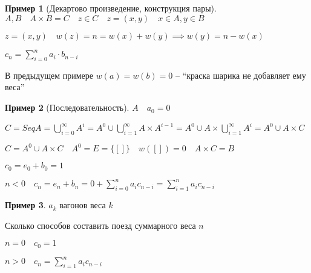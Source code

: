 \documentclass{book}
\theoremstyle{definition}
\newtheorem*{example}{Пример}
\begin{document}
\begin{example}
    [Декартово произведение, конструкция пары]
    $A,B\quad A\times B = C\quad z\in C\quad z = (x,y)\quad x\in A, y\in B$

    $z = (x,y)\quad w(z) = n = w(x)+w(y) \implies w(y) = n-w(x)$

    $c_n = \sum_{i=0}^{n} a_i\cdot b_{n-i}$ 

    В предыдущем примере $w(a) = w(b) = 0$ -- ``краска шарика не добавляет ему веса''
\end{example}

\begin{example}
    [Последовательность]

    $A\quad a_0 = 0$

    $C = Seq A = \bigcup\limits_{i=0}^{\infty }A^i = A^0 \cup \bigcup\limits_{i=1}^{\infty }A\times A^{i-1} = A^0 \cup A\times \bigcup\limits_{i=1}^{\infty } A^i = A^0\cup A\times C  $ 

    $C = A^0\cup A\times C\quad A^0 = E = \{[]\}\quad w([]) = 0\quad A\times C = B$

    $c_0 = e_0 + b_0 = 1$

    $n<0\quad c_n = e_n + b_n=0+\sum_{i=0}^{n} a_ic_{n-i} = \sum_{i=1}^{n} a_ic_{n-i}$
\end{example}

\begin{example}
    $a_k$ вагонов веса  $k$

    Сколько способов составить поезд суммарного веса  $n$

     $n = 0\quad c_0 = 1$

     $n>0\quad c_n = \sum_{i=1}^{n} a_ic_{n-i}$
\end{example}
\end{document}
